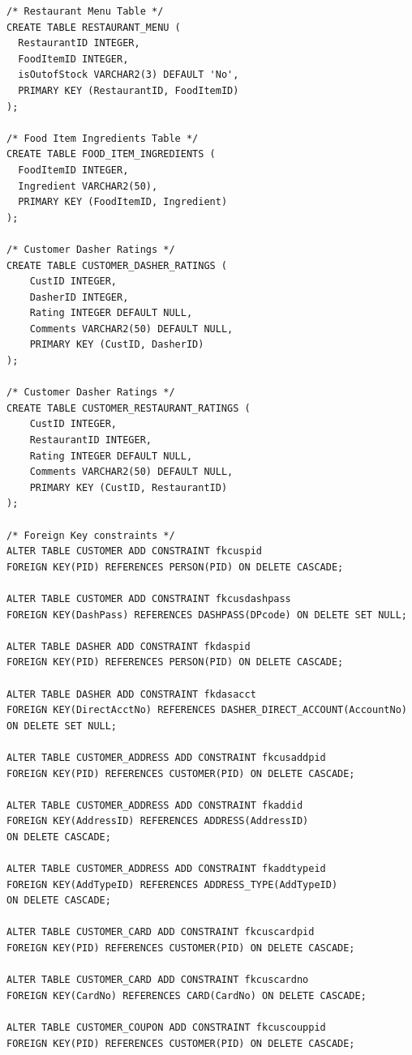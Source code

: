 \documentclass[12pt,letterpaper]{article}
\begin{document}
\begin{lstlisting}
/* Restaurant Menu Table */
CREATE TABLE RESTAURANT_MENU (
  RestaurantID INTEGER,
  FoodItemID INTEGER,
  isOutofStock VARCHAR2(3) DEFAULT 'No',
  PRIMARY KEY (RestaurantID, FoodItemID)
);

/* Food Item Ingredients Table */
CREATE TABLE FOOD_ITEM_INGREDIENTS (
  FoodItemID INTEGER,
  Ingredient VARCHAR2(50),
  PRIMARY KEY (FoodItemID, Ingredient)
);

/* Customer Dasher Ratings */
CREATE TABLE CUSTOMER_DASHER_RATINGS (
    CustID INTEGER,
    DasherID INTEGER,
    Rating INTEGER DEFAULT NULL,
    Comments VARCHAR2(50) DEFAULT NULL,
    PRIMARY KEY (CustID, DasherID)
);

/* Customer Dasher Ratings */
CREATE TABLE CUSTOMER_RESTAURANT_RATINGS (
    CustID INTEGER,
    RestaurantID INTEGER,
    Rating INTEGER DEFAULT NULL,
    Comments VARCHAR2(50) DEFAULT NULL,
    PRIMARY KEY (CustID, RestaurantID)
);

/* Foreign Key constraints */
ALTER TABLE CUSTOMER ADD CONSTRAINT fkcuspid 
FOREIGN KEY(PID) REFERENCES PERSON(PID) ON DELETE CASCADE;

ALTER TABLE CUSTOMER ADD CONSTRAINT fkcusdashpass 
FOREIGN KEY(DashPass) REFERENCES DASHPASS(DPcode) ON DELETE SET NULL;

ALTER TABLE DASHER ADD CONSTRAINT fkdaspid 
FOREIGN KEY(PID) REFERENCES PERSON(PID) ON DELETE CASCADE;

ALTER TABLE DASHER ADD CONSTRAINT fkdasacct 
FOREIGN KEY(DirectAcctNo) REFERENCES DASHER_DIRECT_ACCOUNT(AccountNo) 
ON DELETE SET NULL;

ALTER TABLE CUSTOMER_ADDRESS ADD CONSTRAINT fkcusaddpid 
FOREIGN KEY(PID) REFERENCES CUSTOMER(PID) ON DELETE CASCADE;

ALTER TABLE CUSTOMER_ADDRESS ADD CONSTRAINT fkaddid 
FOREIGN KEY(AddressID) REFERENCES ADDRESS(AddressID) 
ON DELETE CASCADE;

ALTER TABLE CUSTOMER_ADDRESS ADD CONSTRAINT fkaddtypeid 
FOREIGN KEY(AddTypeID) REFERENCES ADDRESS_TYPE(AddTypeID) 
ON DELETE CASCADE;

ALTER TABLE CUSTOMER_CARD ADD CONSTRAINT fkcuscardpid 
FOREIGN KEY(PID) REFERENCES CUSTOMER(PID) ON DELETE CASCADE;

ALTER TABLE CUSTOMER_CARD ADD CONSTRAINT fkcuscardno 
FOREIGN KEY(CardNo) REFERENCES CARD(CardNo) ON DELETE CASCADE;

ALTER TABLE CUSTOMER_COUPON ADD CONSTRAINT fkcuscouppid 
FOREIGN KEY(PID) REFERENCES CUSTOMER(PID) ON DELETE CASCADE;


\end{lstlisting}
\end{document}
